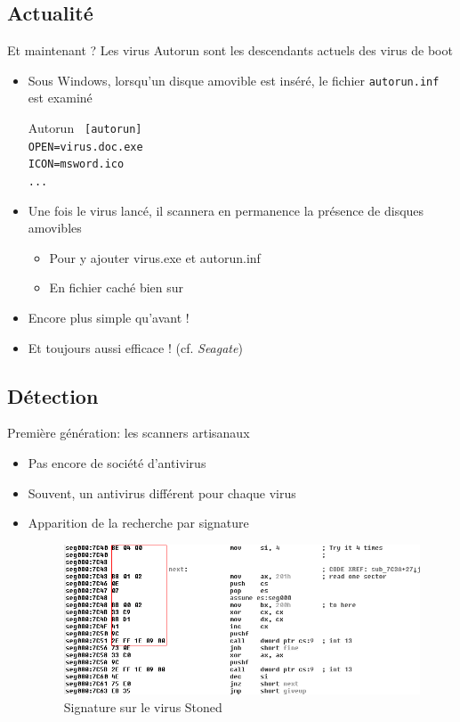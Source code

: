 \documentclass{beamer}
\begin{document}
\subsection{Actualité}
\begin{frame}{Et maintenant ? }
Les virus Autorun sont les descendants actuels des virus de boot
\begin{itemize}
\item Sous Windows, lorsqu'un disque amovible est inséré, le fichier \texttt{autorun.inf} est examiné
\begin{block}{Autorun}
\texttt{
[autorun]\\
OPEN=virus.doc.exe\\
ICON=msword.ico\\
...
}
\end{block}
\item Une fois le virus lancé, il scannera en permanence la présence de disques amovibles
\begin{itemize}
\item Pour y ajouter virus.exe et autorun.inf
\item En fichier caché bien sur
\end{itemize}
\item Encore plus simple qu'avant !
\item Et toujours aussi efficace ! (cf. \textit{Seagate})
\end{itemize}
\end{frame}


\subsection{Détection}

\begin{frame}{Première génération: les scanners artisanaux}
\begin{itemize}
\item Pas encore de société d'antivirus
\item Souvent, un antivirus différent pour chaque virus
\item Apparition de la recherche par signature

\begin{figure}[!ht]
\includegraphics[scale=0.4]{stoned.png}
\center
\caption{Signature sur le virus Stoned}
\end{figure}

\end{itemize}
\end{frame}
\end{document}
